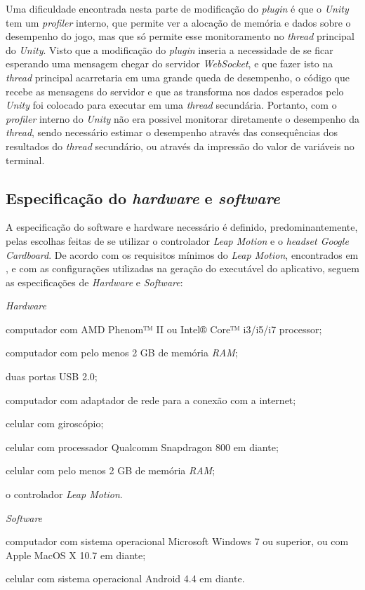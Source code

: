 Uma dificuldade encontrada nesta parte de modificação do \textit{plugin} é que o
\textit{Unity} tem um \textit{profiler} interno, que permite ver a alocação
de memória e dados sobre o desempenho do jogo, mas que só permite esse
monitoramento no \textit{thread} principal do \textit{Unity}. Visto que a 
modificação do \textit{plugin} inseria a necessidade de se ficar esperando uma 
mensagem chegar do servidor \textit{WebSocket}, e que fazer isto na 
\textit{thread} principal acarretaria em uma grande queda de desempenho, 
o código que recebe as mensagens do servidor e que as transforma nos dados
esperados pelo \textit{Unity} foi colocado para executar em uma \textit{thread}
secundária. Portanto, com o \textit{profiler} interno do \textit{Unity} não
era possivel monitorar diretamente o desempenho da \textit{thread}, sendo 
necessário estimar o desempenho através das consequências dos resultados do 
\textit{thread} secundário, ou através da impressão do valor de variáveis
no terminal.

\subsection{Especificação do \textit{hardware} e \textit{software}}\label{subsec-arquitetura-hw-sw}

A especificação do software e hardware necessário é 
definido, predominantemente, pelas escolhas feitas de 
se utilizar o controlador \textit{Leap Motion} e o 
\textit{headset Google Cardboard}. De acordo com os 
requisitos mínimos do \textit{Leap Motion}, encontrados 
em \cite{leap:2016:requirements}, e com as configurações 
utilizadas na geração do executável do aplicativo, 
seguem as especificações de \textit{Hardware} e \textit{Software}:

\begin{alineas}
	\item \textit{Hardware}
	\begin{alineas}
		\item computador com AMD Phenom™ II ou Intel® Core™ i3/i5/i7 processor;
		\item computador com pelo menos 2 GB de memória \textit{RAM};
		\item duas portas USB 2.0;
		\item computador com adaptador de rede para a conexão com a internet;
		\item celular com giroscópio;
		\item celular com processador Qualcomm Snapdragon 800 em diante;
		\item celular com pelo menos 2 GB de memória \textit{RAM};
		\item o controlador \textit{Leap Motion}.
	\end{alineas}
	\item \textit{Software}
	\begin{alineas}
		\item computador com sistema operacional Microsoft Windows 7 ou superior, ou com Apple MacOS X 10.7 em diante;
		\item celular com sistema operacional Android 4.4 em diante.
	\end{alineas}
\end{alineas}
